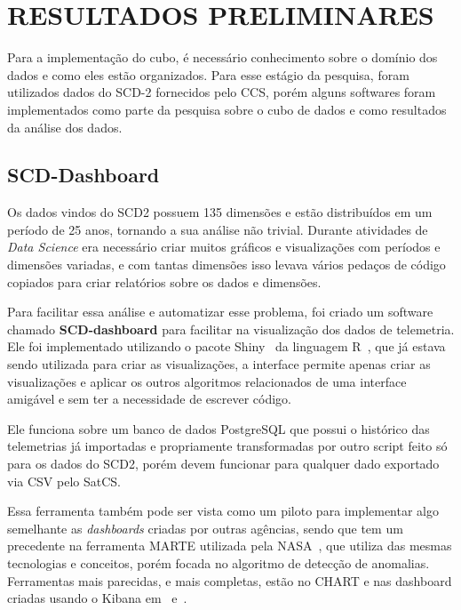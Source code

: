 
\chapter{RESULTADOS PRELIMINARES}\label{ch:impl}

Para a implementação do cubo, é necessário conhecimento sobre o domínio dos dados e como eles estão organizados.
Para esse estágio da pesquisa, foram utilizados dados do SCD-2 fornecidos pelo CCS, porém alguns softwares foram implementados como parte da pesquisa sobre o cubo de dados e como resultados da análise dos dados.

\section{SCD-Dashboard}\label{ch:impl:dash}

Os dados vindos do SCD2 possuem 135 dimensões e estão distribuídos em um período de 25 anos, tornando a sua análise não trivial.
Durante atividades de \textit{Data Science} era necessário criar muitos gráficos e visualizações com períodos e dimensões variadas, e com tantas dimensões isso levava vários pedaços de código copiados para criar relatórios sobre os dados e dimensões.

Para facilitar essa análise e automatizar esse problema, foi criado um software chamado \textbf{SCD-dashboard} para facilitar na visualização dos dados de telemetria.
Ele foi implementado utilizando o pacote Shiny~\cite{changShinyWebApplication2019} da linguagem R~\cite{rcoreteamLanguageEnvironmentStatistical2018}, que já estava sendo utilizada para criar as visualizações, a interface permite apenas criar as visualizações e aplicar os outros algoritmos relacionados de uma interface amigável e sem ter a necessidade de escrever código.

Ele funciona sobre um banco de dados PostgreSQL que possui o histórico das telemetrias já importadas e propriamente transformadas por outro script feito só para os dados do SCD2, porém devem funcionar para qualquer dado exportado via CSV pelo SatCS.

Essa ferramenta também pode ser vista como um piloto para implementar algo semelhante as \textit{dashboards} criadas por outras agências, sendo que tem um precedente na ferramenta MARTE utilizada pela NASA~\cite{fernandezTelemetryAnomalyDetection2017}, que utiliza das mesmas tecnologias e conceitos, porém focada no algoritmo de detecção de anomalias.
Ferramentas mais parecidas, e mais completas, estão no CHART e nas dashboard criadas usando o Kibana em~\cite{mateikUsingBigData2017} e~\cite{zhangBigDataFramework2017}.

